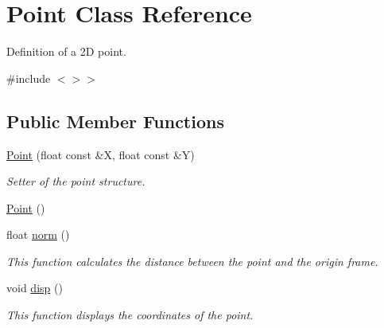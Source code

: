 \hypertarget{struct_point}{}\section{Point Class Reference}
\label{struct_point}


Definition of a 2D point.  




{\ttfamily \#include $<$$>$$>$}

\subsection*{Public Member Functions}
\begin{DoxyCompactItemize}
\item 
\mbox{\hyperlink{struct_point_ae21aa995e6a4c5d1b21f6e45d7a2fee8}{Point}} (float const \&X, float const \&Y)
\begin{DoxyCompactList}\small\item\em Setter of the point structure. \end{DoxyCompactList}\item 
\mbox{\hyperlink{struct_point_ad92f2337b839a94ce97dcdb439b4325a}{Point}} ()
\item 
float \mbox{\hyperlink{struct_point_aadf9f3d612360343f14fc6a23c73bfbd}{norm}} ()
\begin{DoxyCompactList}\small\item\em This function calculates the distance between the point and the origin frame. \end{DoxyCompactList}\item 
\mbox{\label{struct_point_a8cfda2fa37d8212c560f993f66e69ecb}} 
void \mbox{\hyperlink{struct_point_a8cfda2fa37d8212c560f993f66e69ecb}{disp}} ()
\begin{DoxyCompactList}\small\item\em This function displays the coordinates of the point. \end{DoxyCompactList}\end{DoxyCompactItemize}
